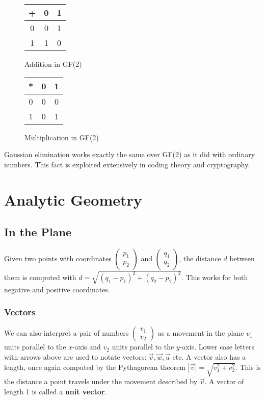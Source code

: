 \documentclass{article}
\begin{document}
	\begin{figure}[ht]
		\begin{minipage}[t]{0.45\textwidth}
		\centering
			\begin{tabular}{c|cc}
				+ & 0 & 1 \\ \hline
				0 & 0 & 1 \\
				1 & 1 & 0
			\end{tabular}
			
			\caption{Addition in GF(2)}
		\end{minipage}
		\hfill
		\begin{minipage}[t]{0.45\textwidth}
		\centering
			\begin{tabular}{c|cc}
			* & 0 & 1 \\ \hline
			0 & 0 & 0 \\
			1 & 0 & 1
			\end{tabular}
			\caption{Multiplication in GF(2)}
		\end{minipage}
	\end{figure}
	
	Gaussian elimination works exactly the same over GF(2) as it did with ordinary numbers. This fact is exploited extensively in coding theory and cryptography.
	
	\section{Analytic Geometry}
	\subsection{In the Plane}
	Given two points with coordinates $\left(\begin{array}{c} p_{1} \\ p_{2}\end{array}\right)$ and $\left(\begin{array}{c} q_{1} \\ q_{2}\end{array}\right)$, the distance $d$ between them is computed with $d = \sqrt{(q_{1} - p_{1})^{2} + (q_{2} - p_{2})^{2} }$. This works for both negative and positive coordinates.
	
	\subsubsection{Vectors}
	We can also interpret a pair of numbers $\left(\begin{array}{c} v_{1} \\ v_{2}\end{array}\right)$ as a movement in the plane $v_{1}$ units parallel to the $x$-axis and $v_{2}$ units parallel to the $y$-axis. Lower case letters with arrows above are used to notate vectors: $\overrightarrow{v}, \overrightarrow{w}, \overrightarrow{u}$ etc. A vector also has a length, once again computed by the Pythagorean theorem $ |\overrightarrow{v}| = \sqrt{v_{1}^{2} + v_{2}^{2}} $. This is the distance a point travels under the movement described by $\overrightarrow{v}$. A vector of length 1 is called a \textbf{unit vector}.
\end{document}
